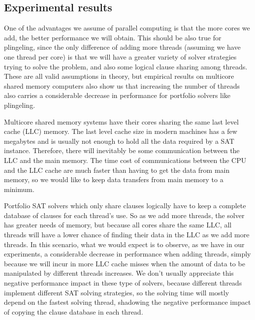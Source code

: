 \documentclass{llncs}
\begin{document}
\subsection{Experimental results}

One of the advantages we assume of parallel computing is that the more
cores we add, the better performance we will obtain. This should be
also true for plingeling, since the only difference of adding more
threads (assuming we have one thread per core) is that we will have a
greater variety of solver strategies trying to solve the problem, and
also some logical clause sharing among threads. These are all valid
assumptions in theory, but empirical results on multicore shared
memory computers also show us that increasing the number of threads
also carries a considerable decrease in performance for portfolio
solvers like plingeling.

Multicore shared memory systems have their cores sharing the same last
level cache (LLC) memory. The last level cache size in modern machines
has a few megabytes and is usually not enough to hold all the data
required by a SAT instance. Therefore, there will inevitably be some
communication between the LLC and the main memory. The time cost of
communications between the CPU and the LLC cache are much faster than
having to get the data from main memory, so we would like to keep data
transfers from main memory to a minimum.

Portfolio SAT solvers which only share clauses logically have to keep
a complete database of clauses for each thread's use. So as we add
more threads, the solver has greater needs of memory, but because all
cores share the same LLC, all threads will have a lower chance of
finding their data in the LLC as we add more threads. In this
scenario, what we would expect is to observe, as we have in our
experiments, a considerable decrease in performance when adding
threads, simply because we will incur in more LLC cache misses when
the amount of data to be manipulated by different threads
increases. We don't usually appreciate this negative performance
impact in these type of solvers, because different threads implement
different SAT solving strategies, so the solving time will mostly
depend on the fastest solving thread, shadowing the negative
performance impact of copying the clause database in each thread.

\end{document}
